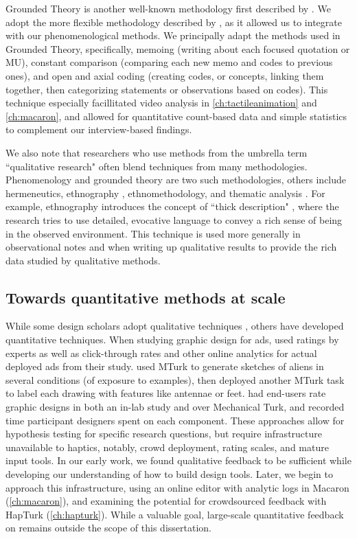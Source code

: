 Grounded Theory is another well-known methodology first described by \citet{glaser1966awareness}.
We adopt the more flexible methodology described by \citet{Corbin2008}, as it allowed us to integrate with our phenomenological methods.
We principally adapt the methods used in Grounded Theory, specifically, memoing (writing about each focused quotation or MU), constant comparison (comparing each new memo and codes to previous ones), and open and axial coding (creating codes, or concepts, linking them together, then categorizing statements or observations based on codes).
This technique especially facillitated video analysis in \autoref{ch:tactileanimation} and \autoref{ch:macaron}, and allowed for quantitative count-based data and simple statistics to complement our interview-based findings.

We also note that researchers who use methods from the umbrella term ``qualitative research" often blend techniques from many methodologies.
Phenomenology and grounded theory are two such methodologies, others include hermeneutics, ethnography \cite{Moustakas1994}, ethnomethodology, and thematic analysis \cite{Ryan2003}.
For example, ethnography introduces the concept of ``thick description" \cite{}, where the research tries to use detailed, evocative language to convey a rich sense of being in the observed environment.
This technique is used more generally in observational notes and when writing up qualitative results to provide the rich data studied by qualitative methods.

\subsection{Towards quantitative methods at scale}
While some design scholars adopt qualitative techniques \cite{Schon1982,Cross2007,Cross2011}, others have developed quantitative techniques.
When studying graphic design for ads, \citet{Dow2011} used ratings by experts as well as click-through rates and other online analytics for actual deployed ads from their study.
\citet{Kulkarni2012} used MTurk to generate sketches of aliens in several conditions (of exposure to examples), then deployed another MTurk task to label each drawing with features like antennae or feet.
\citet{Lee2010a} had end-users rate graphic designs in both an in-lab study and over Mechanical Turk, and recorded time participant designers spent on each component.
These approaches allow for hypothesis testing for specific research questions, but require infrastructure unavailable to haptics, notably, crowd deployment, rating scales, and mature input tools.
In our early work, we found qualitative feedback to be sufficient while developing our understanding of how to build design tools.
Later, we begin to approach this infrastructure, using an online editor with analytic logs in Macaron (\autoref{ch:macaron}), and examining the potential for crowdsourced feedback with HapTurk (\autoref{ch:hapturk}).
While a valuable goal, large-scale quantitative feedback on \haxd remains outside the scope of this dissertation.



